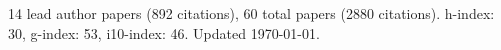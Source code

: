 14 lead author papers (892 citations),
60 total papers (2880 citations).\newline
h-index: 30, g-index: 53, i10-index: 46. Updated \today.